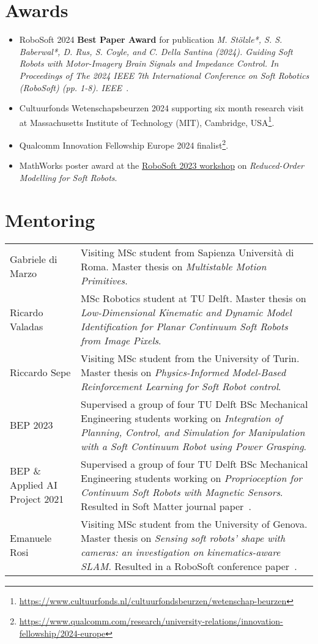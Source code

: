 \section*{Awards}
\begin{itemize}
    \item[\faTrophy] RoboSoft 2024 \textbf{Best Paper Award} for publication \emph{M. Stölzle*, S. S. Baberwal*, D. Rus, S. Coyle, and C. Della Santina (2024). Guiding Soft Robots with Motor-Imagery Brain Signals and Impedance Control. In Proceedings of The 2024 IEEE 7th International Conference on Soft Robotics (RoboSoft) (pp. 1-8). IEEE}~\cite{stolzle2024guiding}.
    \item[\faTrophy] Cultuurfonds Wetenschapsbeurzen 2024 supporting six month research visit at Massachusetts Institute of Technology (MIT), Cambridge, USA\footnote{\url{https://www.cultuurfonds.nl/cultuurfondsbeurzen/wetenschap-beurzen}}.
    \item[\faTrophy] Qualcomm Innovation Fellowship Europe 2024 finalist\footnote{\url{https://www.qualcomm.com/research/university-relations/innovation-fellowship/2024-europe}}.
    \item[\faTrophy] MathWorks poster award at the \href{https://sites.google.com/view/robosoft2023-workshop-rom/home}{RoboSoft 2023 workshop} on \emph{Reduced-Order Modelling for Soft Robots}.
\end{itemize}

\section*{Mentoring}
\noindent
\begin{longtable}{p{} p{}}
    Gabriele di Marzo & Visiting MSc student from Sapienza Università di Roma. Master thesis on \emph{Multistable Motion Primitives}.\\
    Ricardo Valadas & MSc Robotics student at TU Delft. Master thesis on \emph{Low-Dimensional Kinematic and Dynamic Model Identification for Planar Continuum Soft Robots from Image Pixels}.\\
    Riccardo Sepe & Visiting MSc student from the University of Turin. Master thesis on \emph{Physics-Informed Model-Based Reinforcement Learning for Soft Robot control}.\\
    BEP 2023 & Supervised a group of four TU Delft BSc Mechanical Engineering students working on \emph{Integration of Planning, Control, and Simulation for Manipulation with a Soft Continuum Robot using Power Grasping}.\\
    BEP \& Applied AI Project 2021 & Supervised a group of four TU Delft BSc Mechanical Engineering students working on \emph{Proprioception for Continuum Soft Robots with Magnetic Sensors}. Resulted in Soft Matter journal paper~\cite{baaij2023learning}.\\
    Emanuele Rosi & Visiting MSc student from the University of Genova. Master thesis on \emph{Sensing soft robots' shape with cameras: an investigation on kinematics-aware SLAM}. Resulted in a RoboSoft conference paper~\cite{rosi2022sensing}.\\
\end{longtable}

